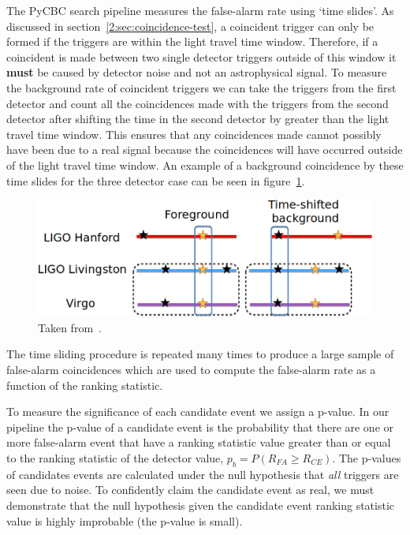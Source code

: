 The PyCBC search pipeline measures the false-alarm rate using `time slides'. As discussed in section~\ref{2:sec:coincidence-test}, a coincident trigger can only be formed if the triggers are within the light travel time window. Therefore, if a coincident is made between two single detector triggers outside of this window it \textbf{must} be caused by detector noise and not an astrophysical signal. To measure the background rate of coincident triggers we can take the triggers from the first detector and count all the coincidences made with the triggers from the second detector after shifting the time in the second detector by greater than the light travel time window. This ensures that any coincidences made cannot possibly have been due to a real signal because the coincidences will have occurred outside of the light travel time window. An example of a background coincidence by these time slides for the three detector case can be seen in figure~\ref{2:fig:timeslides}.
%
\begin{figure}
    \centering
    \includegraphics[width=1.0\linewidth]{images/2_searches/TimeslideExample.png}
    \caption{Taken from~\cite{PyCBC_global:2020}.}
    \label{2:fig:timeslides}
\end{figure}
%

The time sliding procedure is repeated many times to produce a large sample of false-alarm coincidences which are used to compute the false-alarm rate as a function of the ranking statistic.

To measure the significance of each candidate event we assign a p-value. In our pipeline the p-value of a candidate event is the probability that there are one or more false-alarm event that have a ranking statistic value greater than or equal to the ranking statistic of the detector value, $p_{b} = P(R_{FA} \ge R_{CE})$. The p-values of candidates events are calculated under the null hypothesis that \textit{all} triggers are seen due to noise. To confidently claim the candidate event as real, we must demonstrate that the null hypothesis given the candidate event ranking statistic value is highly improbable (the p-value is small).


